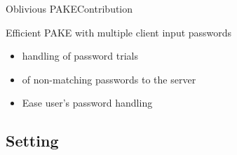 \documentclass[notes,xcolor=dvipsnames]{beamer}
\begin{document}
\begin{frame}{Oblivious PAKE}{Contribution}

	\begin{beamerboxesrounded}[upper=uppercol,lower=lowercol,shadow=true]{}\centering
		Efficient PAKE with multiple client input passwords
	\end{beamerboxesrounded}

	
	\pause	
	\vspace*{2em}	
	
	
	\begin{itemize}
		\item {} handling of password trials
		\item {} of non-matching passwords to the server
		\item Ease user's password handling
	\end{itemize}
	
\end{frame}

\subsection{Setting}
\end{document}

